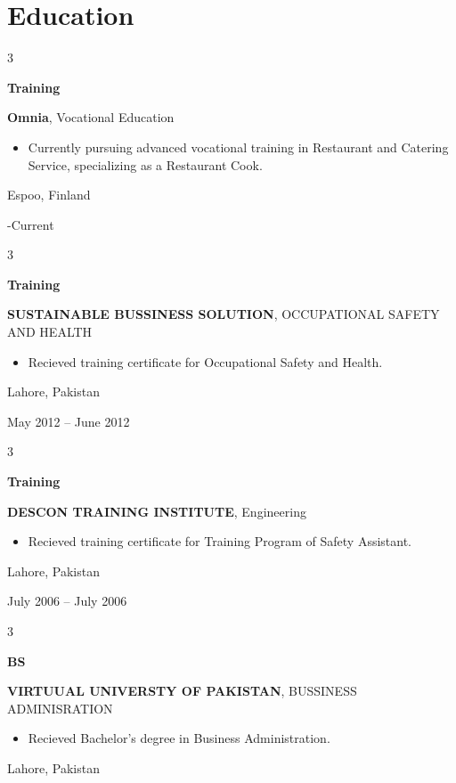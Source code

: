 \documentclass[10pt, a4paper]{article}
\newenvironment{highlights}{
    \begin{itemize}[
        topsep=0.10 cm,
        parsep=0.10 cm,
        partopsep=0pt,
        itemsep=0pt,
        leftmargin=0 cm + 10pt
    ]
}{
    \end{itemize}
} %
\newenvironment{threecolentry}[3][]{
    \onecolentry
    \def\thirdColumn{#3}
    \setcolumnwidth{1 cm, \fill, 2.5 cm}
    \begin{paracol}{3}
    {\raggedright #2} \switchcolumn
}{
    \switchcolumn \raggedleft \thirdColumn
    \end{paracol}
    \endonecolentry
} %
\begin{document}
    
    \section{Education}



        
        \begin{threecolentry}{\textbf{Training}}{
            Espoo, Finland

        -Current
        }
            \textbf{Omnia}, Vocational Education
            \begin{highlights}
                \item Currently pursuing advanced vocational training in Restaurant and Catering Service, specializing as a Restaurant Cook.
            \end{highlights}
        \end{threecolentry}

        \vspace{0.2 cm}

        \begin{threecolentry}{\textbf{Training}}{
            Lahore, Pakistan

        May 2012 – June 2012
        }
            \textbf{SUSTAINABLE BUSSINESS SOLUTION}, OCCUPATIONAL SAFETY AND HEALTH
            \begin{highlights}
                \item Recieved training certificate for Occupational Safety and Health.
            \end{highlights}
        \end{threecolentry}

        \vspace{0.2 cm}

        \begin{threecolentry}{\textbf{Training}}{
            Lahore, Pakistan

        July 2006 – July 2006
        }
            \textbf{DESCON TRAINING INSTITUTE}, Engineering
            \begin{highlights}
                \item Recieved training certificate for Training Program of Safety Assistant.
            \end{highlights}
        \end{threecolentry}

        \vspace{0.2 cm}

        \begin{threecolentry}{\textbf{BS}}{
            Lahore, Pakistan
        }
            \textbf{VIRTUUAL UNIVERSTY OF PAKISTAN}, BUSSINESS ADMINISRATION
            \begin{highlights}
                \item Recieved Bachelor's degree in Business Administration.
            \end{highlights}
        \end{threecolentry}
\end{document}
